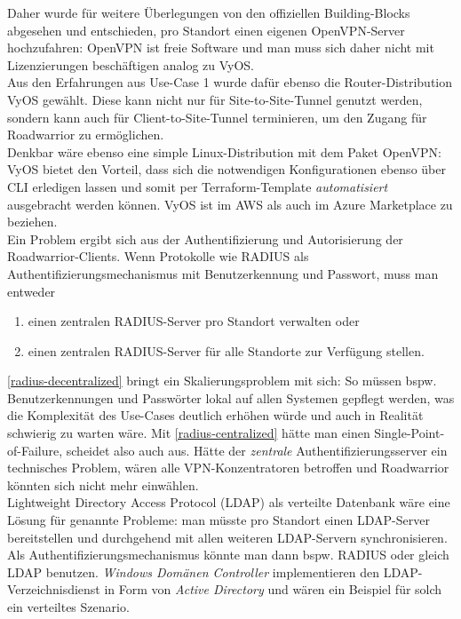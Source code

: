 Daher wurde für weitere Überlegungen von den offiziellen Building-Blocks abgesehen und entschieden, pro Standort einen eigenen OpenVPN-Server hochzufahren: OpenVPN ist freie Software und man muss sich daher nicht mit Lizenzierungen beschäftigen analog zu VyOS.\\
Aus den Erfahrungen aus Use-Case 1 wurde dafür ebenso die Router-Distribution VyOS gewählt. Diese kann nicht nur für Site-to-Site-Tunnel genutzt werden, sondern kann auch für Client-to-Site-Tunnel terminieren, um den Zugang für Roadwarrior zu ermöglichen.\\
Denkbar wäre ebenso eine simple Linux-Distribution mit dem Paket OpenVPN: VyOS bietet den Vorteil, dass sich die notwendigen Konfigurationen ebenso über CLI erledigen lassen und somit per Terraform-Template \textit{automatisiert} ausgebracht werden können\cite{vyosopenvpn2021}. VyOS ist im AWS als auch im Azure Marketplace zu beziehen.\\
Ein Problem ergibt sich aus der Authentifizierung und Autorisierung der Roadwarrior-Clients. Wenn Protokolle wie RADIUS\cite{rfc2865} als Authentifizierungsmechanismus mit Benutzerkennung und Passwort, muss man entweder
\begin{enumerate}[label=(\alph*)]
\item \label{radius-decentralized} einen zentralen RADIUS-Server pro Standort verwalten oder
\item \label{radius-centralized} einen zentralen RADIUS-Server für alle Standorte zur Verfügung stellen.
\end{enumerate}
\ref{radius-decentralized} bringt ein Skalierungsproblem mit sich: So müssen bspw. Benutzerkennungen und Passwörter lokal auf allen Systemen gepflegt werden, was die Komplexität des Use-Cases deutlich erhöhen würde und auch in Realität schwierig zu warten wäre. Mit \ref{radius-centralized} hätte man einen Single-Point-of-Failure, scheidet also auch aus. Hätte der \textit{zentrale} Authentifizierungsserver ein technisches Problem, wären alle VPN-Konzentratoren betroffen und Roadwarrior könnten sich nicht mehr einwählen.\\
Lightweight Directory Access Protocol (LDAP)\cite{rfc4511} als verteilte Datenbank wäre eine Lösung für genannte Probleme: man müsste pro Standort einen LDAP-Server bereitstellen und durchgehend mit allen weiteren LDAP-Servern synchronisieren. Als Authentifizierungsmechanismus könnte man dann bspw. RADIUS\cite{rfc2865} oder gleich LDAP benutzen. \textit{Windows Domänen Controller} implementieren den LDAP-Verzeichnisdienst in Form von \textit{Active Directory} und wären ein Beispiel für solch ein verteiltes Szenario.\cite[S.603-604]{Tanenbaum2003}\\
